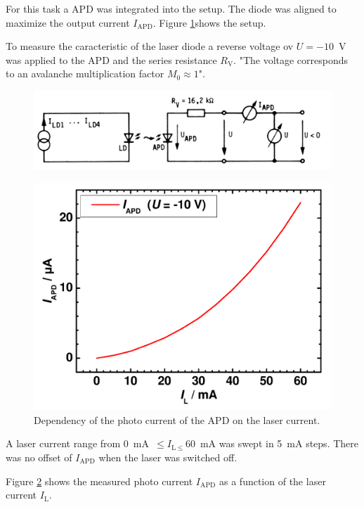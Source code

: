 For this task a APD was integrated into the setup. The diode was aligned to maximize the output current $I_{\mathrm{APD}}$.
Figure \ref{fig:T3_setup}\footnotemark[1] shows the setup.

To measure the caracteristic of the laser diode a reverse voltage ov $U = -10$~V was applied to the APD and the series resistance $R_{\mathrm{V}}$. "The voltage corresponds to an avalanche multiplication factor $M_0 \approx 1$"\footnotemark[1].

\begin{figure}%
\centering
\includegraphics[width=.85\columnwidth]{Grafiken/T3_setup.jpg}%
\caption{}%
\label{fig:T3_setup}%
\end{figure}


\begin{figure}%
\centering
\includegraphics[width=.5\columnwidth]{Grafiken/T3_laser.pdf}%
\caption{Dependency of the photo current of the APD on the laser current.}%
\label{fig:T3_laser}%
\end{figure}


A laser current range from 0~mA~$\leq I_{\mathrm{L}\leq} 60$~mA was swept in 5~mA steps. There was no offset of $I_{\mathrm{APD}}$ when the laser was switched off. 

Figure \ref{fig:T3_laser} shows the measured photo current $I_{\mathrm{APD}}$ as a function of the laser current $I_{\mathrm{L}}$. 

